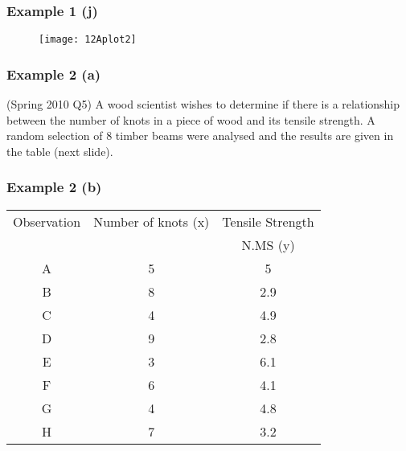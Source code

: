 \documentclass[a4]{beamer}
\begin{document}
\begin{frame}
\frametitle{Example 1 (j)}

\begin{figure}
  \texttt{[image: 12Aplot2]}\\
\end{figure}

\end{frame}
\begin{frame}
\frametitle{Example 2 (a)}
(Spring 2010 Q5)\newline
A wood scientist wishes to determine if there is a relationship between the number of knots in a piece of wood and its tensile strength. A random selection of 8 timber beams were analysed and the results are given in the table (next slide).
\end{frame}
\begin{frame}
\frametitle{Example 2 (b)}
\begin{center}
\begin{tabular}{|c|c|c|}
\hline
Observation 	&	Number of knots (x) 	&	Tensile Strength 	\\
&		&	N.MS (y)	\\ \hline
A 	&	5	&	5	\\
B 	&	8	&	2.9	\\
C 	&	4	&	4.9	\\
D 	&	9	&	2.8	\\
E 	&	3	&	6.1	\\
F 	&	6	&	4.1	\\
G 	&	4	&	4.8	\\
H 	&	7	&	3.2	\\
  \hline
\end{tabular}
\end{center}

\end{frame}
\end{document}
